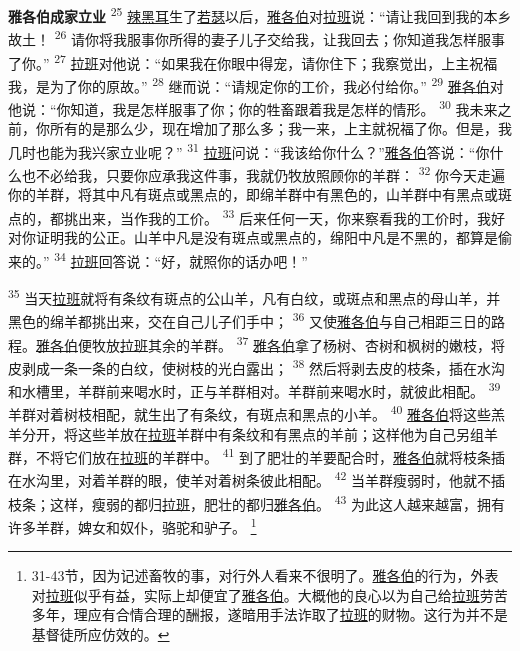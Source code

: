 \textbf{雅各伯成家立业\quad}
\textsuperscript{25}
\uline{辣黑耳}生了\uline{若瑟}以后，\uline{雅各伯}对\uline{拉班}说：“请让我回到我的本乡故土！
\textsuperscript{26}
请你将我服事你所得的妻子儿子交给我，让我回去；你知道我怎样服事了你。”
\textsuperscript{27}
\uline{拉班}对他说：“如果我在你眼中得宠，请你住下；我察觉出，上主祝福我，是为了你的原故。”
\textsuperscript{28}
继而说：“请规定你的工价，我必付给你。”
\textsuperscript{29}
\uline{雅各伯}对他说：“你知道，我是怎样服事了你；你的牲畜跟着我是怎样的情形。
\textsuperscript{30}
我未来之前，你所有的是那么少，现在增加了那么多；我一来，上主就祝福了你。但是，我几时也能为我兴家立业呢？”
\textsuperscript{31}
\uline{拉班}问说：“我该给你什么？”\uline{雅各伯}答说：“你什么也不必给我，只要你应承我这件事，我就仍牧放照顾你的羊群：
\textsuperscript{32}
你今天走遍你的羊群，将其中凡有斑点或黑点的，即绵羊群中有黑色的，山羊群中有黑点或斑点的，都挑出来，当作我的工价。
\textsuperscript{33}
后来任何一天，你来察看我的工价时，我好对你证明我的公正。山羊中凡是没有斑点或黑点的，绵阳中凡是不黑的，都算是偷来的。”
\textsuperscript{34}
\uline{拉班}回答说：“好，就照你的话办吧！”

\textsuperscript{35}
当天\uline{拉班}就将有条纹有斑点的公山羊，凡有白纹，或斑点和黑点的母山羊，并黑色的绵羊都挑出来，交在自己儿子们手中；
\textsuperscript{36}
又使\uline{雅各伯}与自己相距三日的路程。\uline{雅各伯}便牧放\uline{拉班}其余的羊群。
\textsuperscript{37}
\uline{雅各伯}拿了杨树、杏树和枫树的嫩枝，将皮剥成一条一条的白纹，使树枝的光白露出；
\textsuperscript{38}
然后将剥去皮的枝条，插在水沟和水槽里，羊群前来喝水时，正与羊群相对。羊群前来喝水时，就彼此相配。
\textsuperscript{39}
羊群对着树枝相配，就生出了有条纹，有斑点和黑点的小羊。
\textsuperscript{40}
\uline{雅各伯}将这些羔羊分开，将这些羊放在\uline{拉班}羊群中有条纹和有黑点的羊前；这样他为自己另组羊群，不将它们放在\uline{拉班}的羊群中。
\textsuperscript{41}
到了肥壮的羊要配合时，\uline{雅各伯}就将枝条插在水沟里，对着羊群的眼，使羊对着树条彼此相配。
\textsuperscript{42}
当羊群瘦弱时，他就不插枝条；这样，瘦弱的都归\uline{拉班}，肥壮的都归\uline{雅各伯}。
\textsuperscript{43}
为此这人越来越富，拥有许多羊群，婢女和奴仆，骆驼和驴子。
\footnote{31-43节，因为记述畜牧的事，对行外人看来不很明了。\uline{雅各伯}的行为，外表对\uline{拉班}似乎有益，实际上却便宜了\uline{雅各伯}。大概他的良心以为自己给\uline{拉班}劳苦多年，理应有合情合理的酬报，遂暗用手法诈取了\uline{拉班}的财物。这行为并不是基督徒所应仿效的。}

